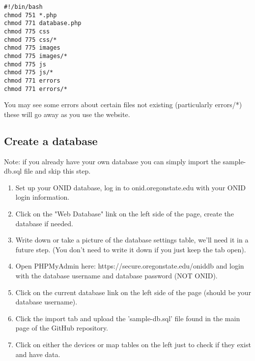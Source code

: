 \documentclass[onecolumn, draftclsnofoot,10pt, compsoc]{IEEEtran}
\begin{document}
\begin{lstlisting}
#!/bin/bash
chmod 751 *.php
chmod 771 database.php
chmod 775 css
chmod 775 css/*
chmod 775 images
chmod 775 images/*
chmod 775 js
chmod 775 js/*
chmod 771 errors
chmod 771 errors/*
\end{lstlisting}
You may see some errors about certain files not existing (particularly errors/*) these will go away as you use the website.

\subsection{Create a database}
Note: if you already have your own database you can simply import the sample-db.sql file and skip this step. 
\begin{enumerate}
    \item Set up your ONID database, log in to onid.oregonstate.edu with your ONID login information. 
    \item Click on the "Web Database" link on the left side of the page, create the database if needed. 
    \item Write down or take a picture of the database settings table, we'll need it in a future step. (You don't need to write it down if you just keep the tab open). 
    \item Open PHPMyAdmin here: https://secure.oregonstate.edu/oniddb and login with the database username and database password (NOT ONID). 
    \item Click on the current database link on the left side of the page (should be your database username). 
    \item Click the import tab and upload the 'sample-db.sql' file found in the main page of the GitHub repository. 
    \item Click on either the devices or map tables on the left just to check if they exist and have data.
\end{enumerate}
\end{document}
